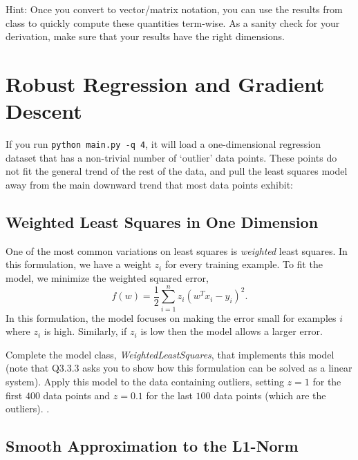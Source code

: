 \documentclass{article}
\begin{document}
Hint: Once you convert to vector/matrix notation, you can use the results from class to quickly compute these quantities term-wise.
As a sanity check for your derivation, make sure that your results have the right dimensions.


\section{Robust Regression and Gradient Descent}

If you run \verb|python main.py -q 4|, it will load a one-dimensional regression
dataset that has a non-trivial number of `outlier' data points.
These points do not fit the general trend of the rest of the data,
and pull the least squares model away from the main downward trend that most data points exhibit:

\subsection{Weighted Least Squares in One Dimension}

One of the most common variations on least squares is \emph{weighted} least squares. In this formulation, we have a weight $z_i$ for every training example. To fit the model, we minimize the weighted squared error,
\[
f(w) =  \frac{1}{2}\sum_{i=1}^n z_i(w^Tx_i - y_i)^2.
\]
In this formulation, the model focuses on making the error small for examples $i$ where $z_i$ is high. Similarly, if $z_i$ is low then the model allows a larger error.

Complete the model class, \emph{WeightedLeastSquares}, that implements this model
(note that Q3.3.3 asks you to show how this formulation can be solved as a linear system).
Apply this model to the data containing outliers, setting $z = 1$ for the first
$400$ data points and $z = 0.1$ for the last $100$ data points (which are the outliers).
.



\subsection{Smooth Approximation to the L1-Norm}
\end{document}
